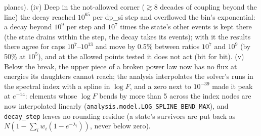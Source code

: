 \documentclass[11pt,a4paper]{article}
\begin{document}
planes). (iv) Deep in the not-allowed corner ($\gtrsim 8$ decades of coupling beyond the line) the decay reached
$10^{65}$ per dp\_si step and overflowed the bin's exponential: a decay beyond $10^9$ per step and $10^7$ times the
state's other events is kept there (the state drains within the step, the decay takes its events); with it the
results there agree for caps $10^7$--$10^{13}$ and move by 0.5\% between ratios $10^7$ and $10^9$ (by 50\% at $10^5$),
and at the allowed points tested it does not act (bit for bit). (v) Below the break,
the upper piece of a broken power law now has no flux at energies its daughters cannot reach; the analysis
interpolates the solver's runs in the spectral index with a spline in $\log F$, and a zero next to $10^{-39}$ made it
peak at $e^{-14}$: elements whose $\log F$ bends by more than 5 across the index nodes are now interpolated linearly
(\texttt{analysis.model.LOG\_SPLINE\_BEND\_MAX}), and \texttt{decay\_step} leaves no rounding residue (a state's
survivors are put back as $N(1 - \sum_i w_i (1 - e^{-\lambda_i}))$, never below zero).
\end{document}
